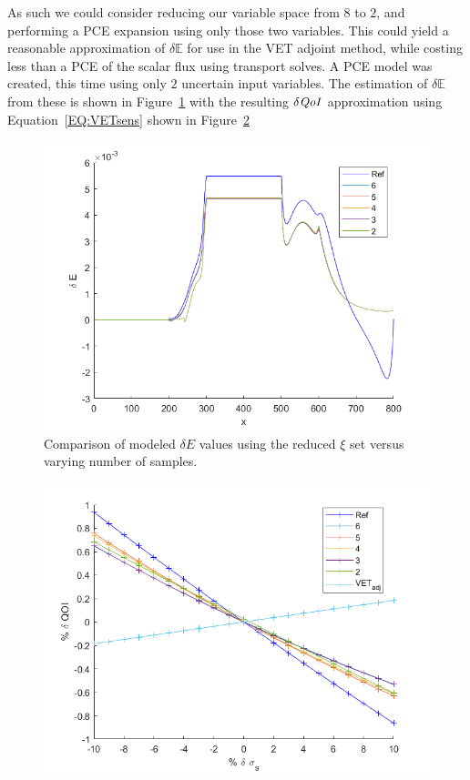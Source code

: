 \documentclass{article}
\newcommand{\Edd}{\mathbb{E}}
\newcommand{\qoi}{{\it QoI}\xspace}
\begin{document}
As such we could consider reducing our variable space from $8$ to $2$, and performing a PCE expansion using only those two variables. This could yield a reasonable approximation of $\delta \Edd$ for use in the VET adjoint method, while costing less than a PCE of the scalar flux using transport solves. A PCE model was created, this time using only $2$ uncertain input variables. The estimation of $\delta \Edd$ from these is shown in Figure~\ref{fig:E2n} with the resulting $\delta \qoi$ approximation using Equation~\ref{EQ:VETsens} shown in Figure~\ref{fig:E2dqoi}

\begin{figure}[H]
\centering
  \includegraphics[width=0.8 \linewidth]{E2_nsamples.png}
  \caption{Comparison of modeled $\delta E$ values  using the reduced $\xi$ set versus varying number of samples.}
  \label{fig:E2n}
\end{figure} 

\begin{figure}[H]
\centering
  \includegraphics[width=0.8 \linewidth]{E2_dqoi.png}
  \caption{}
 \label{fig:E2dqoi}
\end{figure} 
\end{document}

